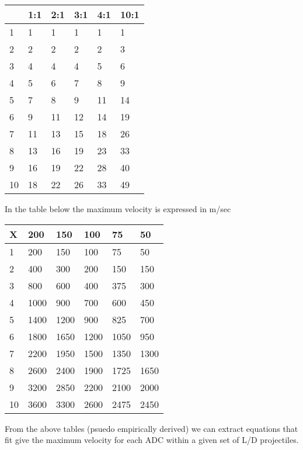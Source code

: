 \begin{tabular}{||l||l|l|l|l|l||}
     &  1:1   &   2:1  &    3:1   &   4:1  &   10:1  \\ \hline
1    &    1   &     1  &      1   &     1  &      1  \\
2    &    2   &     2  &      2   &     2  &      3  \\
3    &    4   &     4  &      4   &     5  &      6  \\
4    &    5   &     6  &      7   &     8  &      9  \\
5    &    7   &     8  &      9   &    11  &     14  \\
6    &    9   &    11  &     12   &    14  &     19  \\
7    &   11   &    13  &     15   &    18  &     26  \\
8    &   13   &    16  &     19   &    23  &     33  \\
9    &   16   &    19  &     22   &    28  &     40  \\
10   &   18   &    22  &     26   &    33  &     49  \\
\end{tabular}
   
In the table below the maximum velocity is expressed in m/sec

\begin{tabular}{||l|l|l|l|l|l||}
X &     200 &      150 &     100 &      75 &      50 \\ \hline
1 &     200 &      150 &     100 &      75 &      50 \\
2 &     400 &      300 &     200 &     150 &     150 \\
3 &     800 &      600 &     400 &     375 &     300 \\
4 &    1000 &      900 &     700 &     600 &     450 \\
5 &    1400 &     1200 &     900 &     825 &     700 \\
6 &    1800 &     1650 &    1200 &    1050 &     950 \\
7 &    2200 &     1950 &    1500 &    1350 &    1300 \\
8 &    2600 &     2400 &    1900 &    1725 &    1650 \\
9 &    3200 &     2850 &    2200 &    2100 &    2000 \\
10&    3600 &     3300 &    2600 &    2475 &    2450 \\
\end{tabular}

From the above tables (psuedo empirically derived) we can extract 
equations that fit give the maximum velocity for each ADC within a
given set of L/D projectiles.

